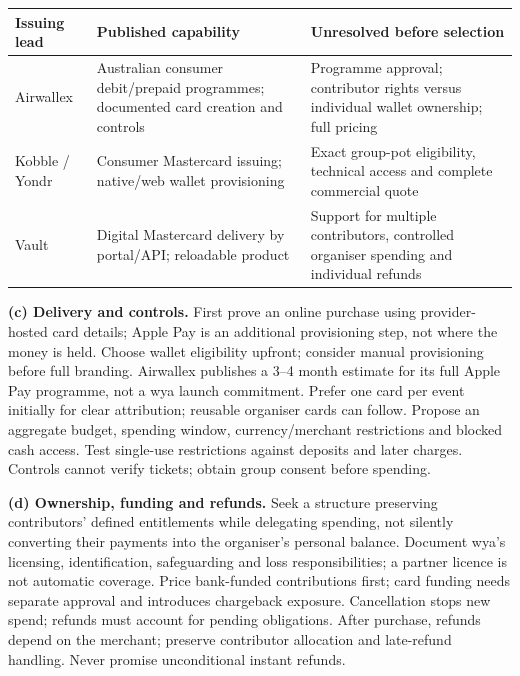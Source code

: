 \documentclass[10pt, a4paper]{report}
\begin{document}
\begin{center}
\footnotesize{}
\begin{tabularx}{\linewidth}{|>{\raggedright\arraybackslash}p{2.4cm}|X|X|}
\hline
\rowcolor{hdrblue}
\textbf{Issuing lead} & \textbf{Published capability} & \textbf{Unresolved before selection} \\
\hline
Airwallex & Australian consumer debit/prepaid programmes; documented card creation and controls & Programme approval; contributor rights versus individual wallet ownership; full pricing \\
\hline
Kobble / Yondr & Consumer Mastercard issuing; native/web wallet provisioning & Exact group-pot eligibility, technical access and complete commercial quote \\
\hline
Vault & Digital Mastercard delivery by portal/API; reloadable product & Support for multiple contributors, controlled organiser spending and individual refunds \\
\hline
\end{tabularx}
\end{center}

\textbf{(c) Delivery and controls.} First prove an online purchase using provider-hosted card details; Apple Pay is an additional provisioning step, not where the money is held. Choose wallet eligibility upfront; consider manual provisioning before full branding. Airwallex publishes a 3--4 month estimate for its full Apple Pay programme, not a wya launch commitment. Prefer one card per event initially for clear attribution; reusable organiser cards can follow. Propose an aggregate budget, spending window, currency/merchant restrictions and blocked cash access. Test single-use restrictions against deposits and later charges. Controls cannot verify tickets; obtain group consent before spending.

\textbf{(d) Ownership, funding and refunds.} Seek a structure preserving contributors' defined entitlements while delegating spending, not silently converting their payments into the organiser's personal balance. Document wya's licensing, identification, safeguarding and loss responsibilities; a partner licence is not automatic coverage. Price bank-funded contributions first; card funding needs separate approval and introduces chargeback exposure. Cancellation stops new spend; refunds must account for pending obligations. After purchase, refunds depend on the merchant; preserve contributor allocation and late-refund handling. Never promise unconditional instant refunds.
\end{document}
